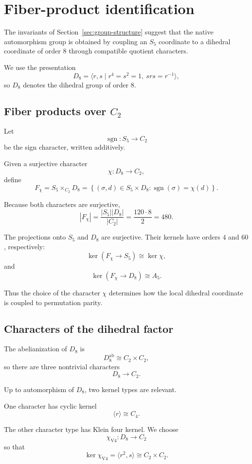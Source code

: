 \section{Fiber-product identification}
\label{sec:fiber-product}

The invariants of Section~\ref{sec:group-structure} suggest that the
native automorphism group is obtained by coupling an $S_5$ coordinate
to a dihedral coordinate of order $8$ through compatible quotient
characters.

We use the presentation
\[
D_8
=
\langle r,s
\mid
r^4=s^2=1,\ srs=r^{-1}
\rangle,
\]
so $D_8$ denotes the dihedral group of order $8$.

\subsection{Fiber products over \texorpdfstring{$C_2$}{C2}}

Let
\[
\operatorname{sgn}\colon S_5\longrightarrow C_2
\]
be the sign character, written additively.

Given a surjective character
\[
\chi\colon D_8\longrightarrow C_2,
\]
define
\[
F_\chi
=
S_5\times_{C_2}D_8
=
\left\{
(\sigma,d)\in S_5\times D_8:
\operatorname{sgn}(\sigma)=\chi(d)
\right\}.
\]

Because both characters are surjective,
\[
|F_\chi|
=
\frac{|S_5||D_8|}{|C_2|}
=
\frac{120\cdot8}{2}
=
480.
\]

The projections onto $S_5$ and $D_8$ are surjective. Their kernels have
orders $4$ and $60$, respectively:
\[
\ker(F_\chi\to S_5)
\cong
\ker\chi,
\]
and
\[
\ker(F_\chi\to D_8)
\cong
A_5.
\]

Thus the choice of the character $\chi$ determines how the local
dihedral coordinate is coupled to permutation parity.

\subsection{Characters of the dihedral factor}

The abelianization of $D_8$ is
\[
D_8^{\mathrm{ab}}\cong C_2\times C_2,
\]
so there are three nontrivial characters
\[
D_8\longrightarrow C_2.
\]

Up to automorphism of $D_8$, two kernel types are relevant.

One character has cyclic kernel
\[
\langle r\rangle\cong C_4.
\]

The other character type has Klein four kernel. We choose
\[
\chi_{\mathrm{V4}}\colon D_8\longrightarrow C_2
\]
so that
\[
\ker\chi_{\mathrm{V4}}
=
\langle r^2,s\rangle
\cong C_2\times C_2.
\]


